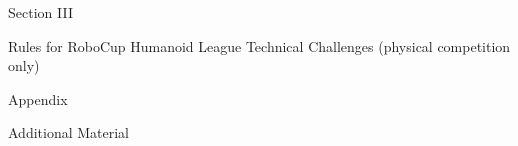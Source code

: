 \documentclass[a4paper]{article}
\begin{document}
    



\clearpage

\begin{center}
\Huge\bfseries{
\vspace*{3cm}
Section III

\vspace*{2cm}

Rules for RoboCup Humanoid League Technical Challenges (physical competition only)}
\end{center}














\clearpage

\begin{center}
  \Huge\bfseries{
    \vspace*{3cm}
    Appendix

    \vspace*{2cm}

    Additional Material}
  
\end{center}



\end{document}
